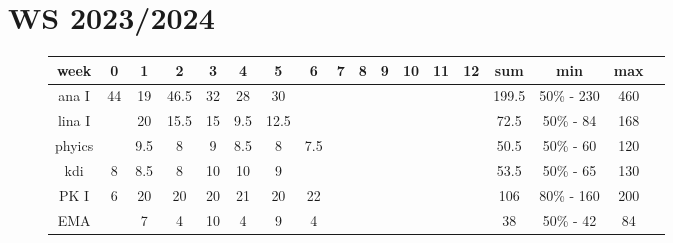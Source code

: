 \documentclass{gadsescript}
\begin{document}
\maketitle
\section{WS 2023/2024}
\begin{figure}[H]
	\begin{tabular}{|c|c|c|c|c|c|c|c|c|c|c|c|c|c|c|c|c|c|}
		\hline
		week	& 0	& 1	& 2	& 3	& 4	& 5	& 6	& 7	& 8	& 9	& 10	& 11	& 12	& sum	& min		& max	\\\hline
		ana I	& 44	& 19	& 46.5	& 32	& 28	& 30	& 	& 	& 	& 	& 	& 	& 	& 199.5	& 50\% - 230	& 460	\\
		lina I	&  	& 20	& 15.5	& 15	& 9.5	& 12.5	&	& 	& 	& 	& 	& 	& 	& 72.5	& 50\% - 84	& 168	\\
		phyics	&	& 9.5	& 8	& 9	& 8.5	& 8	& 7.5 	& 	& 	& 	& 	& 	& 	& 50.5	& 50\% - 60	& 120	\\
		kdi	& 8	& 8.5	& 8	& 10	& 10	& 9	& 	& 	& 	& 	& 	& 	& 	& 53.5	& 50\% - 65	& 130	\\
		PK I	& 6	& 20	& 20	& 20	& 21	& 20	& 22	& 	& 	& 	& 	& 	& 	& 106	& 80\% - 160	& 200	\\
		EMA	& 	& 7	& 4	& 10	& 4	& 9	& 4	& 	& 	& 	& 	& 	& 	& 38	& 50\% - 42	& 84	\\
		\hline
	\end{tabular}
\end{figure}
\end{document}
